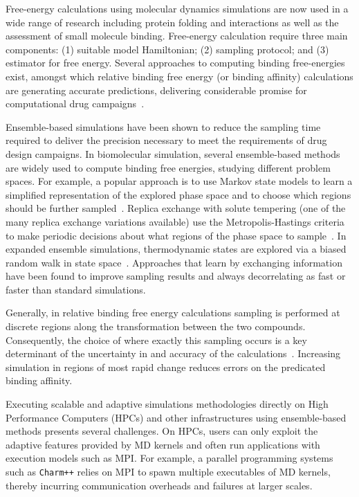 Free-energy calculations using molecular dynamics simulations are now used in
a wide range of research including protein folding and interactions as well
as the assessment of small molecule binding. Free-energy calculation require
three main components: (1) suitable model Hamiltonian; (2) sampling protocol;
and (3) estimator for free energy. Several approaches to computing binding
free-energies exist, amongst which relative binding free energy (or binding
affinity) calculations are generating accurate predictions, delivering
considerable promise for computational drug campaigns~\cite{Karplus2005}.

Ensemble-based simulations have been shown to reduce the sampling time
required to deliver the precision necessary to meet the requirements of drug
design campaigns. In biomolecular simulation, several ensemble-based methods
are widely used to compute binding free energies, studying different problem
spaces. For example, a popular approach is to use Markov state models to
learn a simplified representation of the explored phase space and to choose
which regions should be further sampled~\cite{Bowman2010}. Replica exchange
with solute tempering (one of the many replica exchange variations available)
use the Metropolis-Hastings criteria to make periodic decisions about what
regions of the phase space to sample~\cite{Earl2005,Hritz2008,Kim2012}. In
expanded ensemble simulations, thermodynamic states are explored via a biased
random walk in state space~\cite{Lyubartsev1992}. Approaches that learn by
exchanging information have been found to improve sampling results and always
decorrelating as fast or faster than standard simulations.

Generally, in relative binding free energy calculations sampling is performed
at discrete regions along the transformation between the two compounds.
Consequently, the choice of where exactly this sampling occurs is a key
determinant of the uncertainty in and accuracy of the
calculations~\cite{Ruiter2013, Ruiter2016}. Increasing simulation in regions of most
rapid change reduces errors on the predicated binding affinity.

Executing scalable and adaptive simulations methodologies directly on High
Performance Computers (HPCs) and other infrastructures using ensemble-based
methods presents several challenges. On HPCs, users can only exploit the
adaptive features provided by MD kernels and often run applications with
execution models such as MPI. For example, a parallel programming systems
such as \texttt{Charm++} relies on MPI to spawn multiple executables of MD
kernels, thereby incurring communication overheads and failures at larger
scales.


